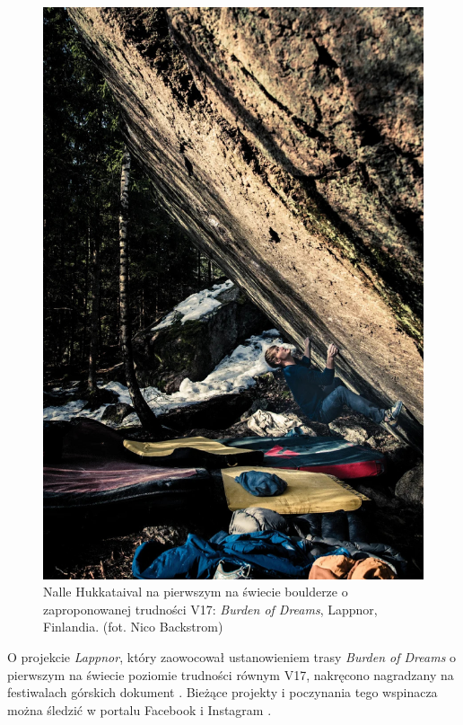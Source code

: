 \documentclass{article}
\begin{document}
\begin{figure}[!htbp]
	\begin{center}
		\includegraphics[width=0.5\linewidth]{images/hukkataival.eps}
	\end{center}
	\caption{Nalle Hukkataival na pierwszym na świecie boulderze o zaproponowanej trudności V17: \textit{Burden of Dreams}, Lappnor, Finlandia. (fot. Nico Backstrom) \cite{climb-hukka}}
	\label{hukka}
\end{figure}

O projekcie \textit{Lappnor}, który zaowocował ustanowieniem trasy \textit{Burden of Dreams} o pierwszym na świecie poziomie trudności równym V17, nakręcono nagradzany na festiwalach górskich dokument \cite{docu-lappnor}. Bieżące projekty i poczynania tego wspinacza można śledzić w portalu Facebook \cite{hukka-fb} i Instagram \cite{hukka-ig}.

\nocite{*}
\printbibliography
\end{document}
